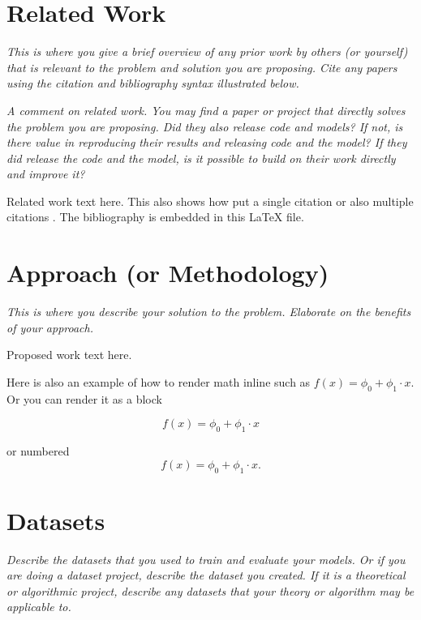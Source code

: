 \documentclass[11pt, oneside]{article}   	%
\begin{document}
\section*{Related Work}

\textit{This is where you give a brief overview of any prior work by
others (or yourself) that is relevant to the problem and solution you
are proposing. Cite any papers using the citation and bibliography syntax illustrated
below.}

\textit{A comment on related work. You may find a paper or project that
directly solves the problem you are proposing. Did they also release code and
models? If not, is there value in reproducing their results and releasing
code and the model? 
If they did release the code and the model, is it possible to build
on their work directly and improve it?}

Related work text here. This also shows how put a single 
citation \cite{citation_key1} or also multiple citations
\cite{citation_key1,citation_key2}.  The bibliography is embedded
in this \LaTeX \hspace*{1pt} file.


\section*{Approach (or Methodology)}

\textit{This is where you describe your  solution to the problem.
Elaborate on the benefits of your approach.}

Proposed work text here. 

Here is also an example of how to render math inline
such as \(f(x) = \phi_0 + \phi_1 \cdot x\). Or you can render it as a block

\[
f(x) = \phi_0 + \phi_1 \cdot x
\]

or numbered
\begin{equation}
f(x) = \phi_0 + \phi_1 \cdot x.
\end{equation}

\section*{Datasets}

\textit{Describe the datasets that you used to train and evaluate your
models. Or if you are doing a dataset project, describe the dataset you
created. If it is a theoretical
or algorithmic project, describe any datasets that your theory or algorithm
may be applicable to.}
\end{document}
